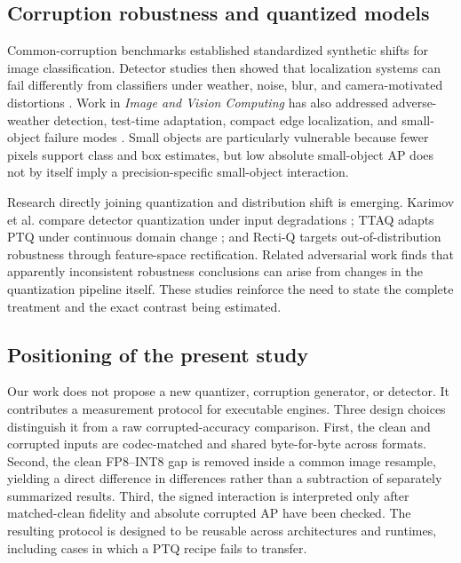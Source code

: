 \subsection{Corruption robustness and quantized models}

Common-corruption benchmarks established standardized synthetic shifts for
image classification\citep{hendrycks2019corruptions}. Detector studies then
showed that localization systems can fail differently from classifiers under
weather, noise, blur, and camera-motivated distortions
\citep{michaelis2019detectorrobustness,liu2024realworldcorruptions}. Work in
\emph{Image and Vision Computing} has also addressed adverse-weather detection,
test-time adaptation, compact edge localization, and small-object failure modes
\citep{luo2024lalm,zhang2025ddt,su2024yolic,zheng2024smallobjectreview}.
Small objects are particularly vulnerable because fewer pixels support class and
box estimates\citep{cheng2023small}, but low absolute small-object AP does not
by itself imply a precision-specific small-object interaction.

Research directly joining quantization and distribution shift is emerging.
Karimov et al. compare detector quantization under input degradations
\citep{karimov2025robustness}; TTAQ adapts PTQ under continuous domain change
\citep{xiao2024ttaq}; and Recti-Q targets out-of-distribution robustness through
feature-space rectification\citep{araghi2026rectiq}. Related adversarial work
finds that apparently inconsistent robustness conclusions can arise from
changes in the quantization pipeline itself\citep{li2024quantrobustness}. These
studies reinforce the need to state the complete treatment and the exact
contrast being estimated.

\subsection{Positioning of the present study}

Our work does not propose a new quantizer, corruption generator, or detector.
It contributes a measurement protocol for executable engines. Three design
choices distinguish it from a raw corrupted-accuracy comparison. First, the
clean and corrupted inputs are codec-matched and shared byte-for-byte across
formats. Second, the clean FP8--INT8 gap is removed inside a common image
resample, yielding a direct difference in differences rather than a subtraction
of separately summarized results. Third, the signed interaction is interpreted
only after matched-clean fidelity and absolute corrupted AP have been checked.
The resulting protocol is designed to be reusable across architectures and
runtimes, including cases in which a PTQ recipe fails to transfer.
